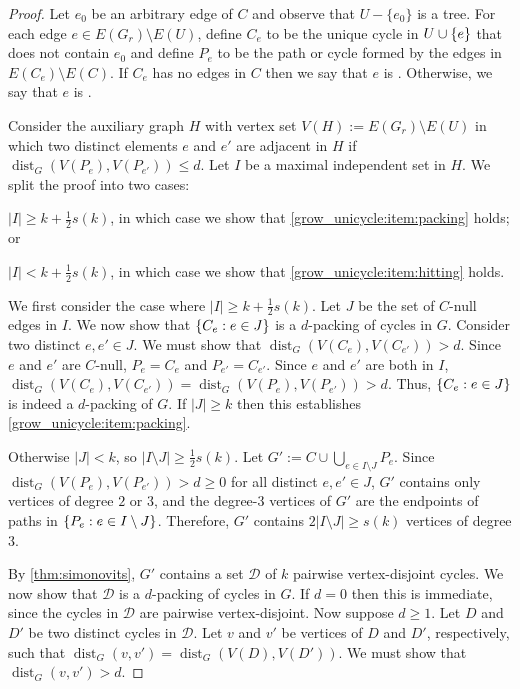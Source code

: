 \documentclass{patmorin}
\DeclareMathOperator{\dist}{dist}
\DeclarePairedDelimiter\set{\{}{\}}
\renewcommand{\mid}{:}  %
\begin{document}
\begin{proof}
  Let $e_0$ be an arbitrary edge of $C$ and observe that $U-\{e_0\}$ is a tree.  For each edge $e\in E(G_{r})\setminus E(U)$,  define $C_e$ to be the unique cycle in $U\cup \set{e}$ that does not contain $e_0$ and define $P_{e}$ to be the path or cycle formed by the edges in $E(C_{e})\setminus E(C)$. If $C_e$ has no edges in $C$ then we say that $e$ is . Otherwise, we say that $e$ is .

  Consider the auxiliary graph $H$ with vertex set $V(H):= E(G_{r})\setminus E(U)$ in which two distinct elements $e$ and $e'$ are adjacent in $H$ if $\dist_G(V(P_{e}),V(P_{e'})) \le d$.  Let $I$ be a maximal independent set in $H$. We split the proof into two cases:
  \begin{enumerate*}[label=\rm(\arabic*)]
    \item $|I|\ge k+\frac{1}{2}s(k)$, in which case we show that \cref{grow_unicycle:item:packing} holds; or
    \item $|I|< k+\frac{1}{2}s(k)$, in which case we show that \cref{grow_unicycle:item:hitting} holds.
  \end{enumerate*}

  We first consider the case where $|I|\ge k+\frac{1}{2}s(k)$.  Let $J$ be the set of $C$-null edges in $I$. We now show that $\set{C_e \mid e\in J}$ is a $d$-packing of cycles in $G$.  Consider two distinct $e,e'\in J$.  We must show that $\dist_G(V(C_e),V(C_{e'}))>d$. Since $e$ and $e'$ are $C$-null, $P_e=C_e$ and $P_{e'}=C_{e'}$. Since $e$ and $e'$ are both in $I$, $\dist_G(V(C_e),V(C_{e'}))=\dist_G(V(P_e),V(P_{e'}))>d$. Thus, $\set{C_e \mid e\in J}$ is indeed a $d$-packing of $G$.  If $|J|\ge k$ then this establishes \eqref{grow_unicycle:item:packing}.

  Otherwise $|J|<k$, so $|I\setminus J|\ge \tfrac{1}{2}s(k)$. Let $G':=C\cup\bigcup_{e\in I\setminus J} P_e$. Since $\dist_G(V(P_e),V(P_{e'}))>d\ge0$ for all distinct $e,e'\in J$, $G'$ contains only vertices of degree $2$ or $3$, and the degree-$3$ vertices of $G'$ are the endpoints of paths in $\set{P_e \mid e\in I\setminus J}$. Therefore, $G'$ contains $2|I\setminus J|\geq s(k)$ vertices of degree $3$.

  By \cref{thm:simonovits}, $G'$ contains a set $\mathcal{D}$ of $k$ pairwise vertex-disjoint cycles. We now show that $\mathcal{D}$ is a $d$-packing of cycles in $G$.  If $d=0$ then this is immediate, since the cycles in $\mathcal{D}$ are pairwise vertex-disjoint.  Now suppose $d\ge 1$. Let $D$ and $D'$ be two distinct cycles in $\mathcal{D}$. Let $v$ and $v'$ be vertices of $D$ and $D'$, respectively, such that $\dist_G(v,v')=\dist_G(V(D),V(D'))$.  We must show that $\dist_G(v,v')>d$.



\end{proof}
\end{document}
